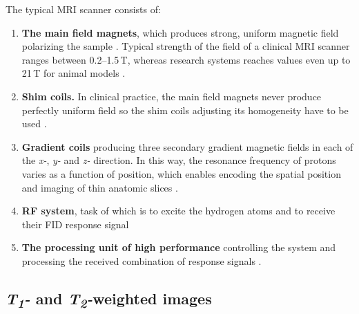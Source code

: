 The typical MRI scanner consists of:
\begin{enumerate}
\item \textbf{The main field magnets}, which produces strong, uniform magnetic field polarizing the sample \cite{biomedical_hanbook_imaging}. Typical strength of the field of a clinical MRI scanner ranges between 0.2--1.5\,T, whereas research systems reaches values even up to 21\,T for animal models \cite{grover2015magnetic, sharma200821}.
\item \textbf{Shim coils.} In clinical practice, the main field magnets never produce perfectly uniform field so the shim coils adjusting its homogeneity have to be used \cite{biomedical_hanbook_imaging}.
\item \textbf{Gradient coils} producing three secondary gradient magnetic fields in each of the \textit{x-}, \textit{y-} and \textit{z-} direction. In this way, the resonance frequency of protons varies as a function of position, which enables encoding the spatial position and imaging of thin anatomic slices \cite{hidalgo2010theory}.
\item \textbf{RF system}, task of which is to excite the hydrogen atoms and to receive their FID response signal \cite{biomedical_hanbook_imaging}
\item \textbf{The processing unit of high performance} controlling the system and processing the received combination of response signals \cite{biomedical_hanbook_imaging}.
\end{enumerate}

\subsection{\textit{T\textsubscript{1}-} and \textit{T\textsubscript{2}-}weighted images}

